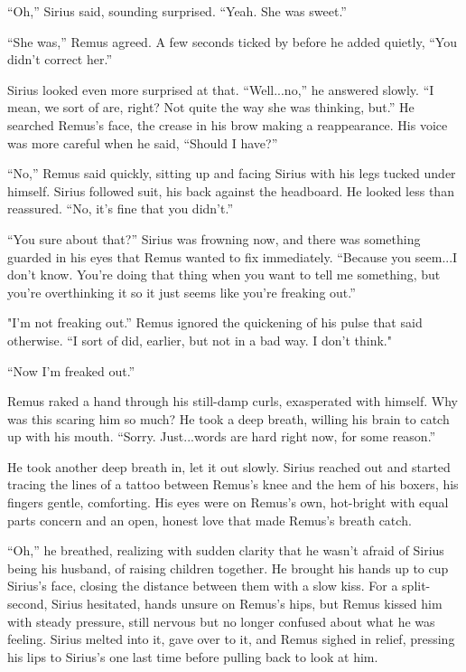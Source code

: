 “Oh,” Sirius said, sounding surprised. “Yeah. She was sweet.”

“She was,” Remus agreed. A few seconds ticked by before he added quietly, “You didn’t correct her.”

Sirius looked even more surprised at that. “Well...no,” he answered slowly. “I mean, we sort of are, right? Not quite the way she was thinking, but.” He searched Remus’s face, the crease in his brow making a reappearance. His voice was more careful when he said, “Should I have?”

“No,” Remus said quickly, sitting up and facing Sirius with his legs tucked under himself. Sirius followed suit, his back against the headboard. He looked less than reassured. “No, it’s fine that you didn’t.”

“You sure about that?” Sirius was frowning now, and there was something guarded in his eyes that Remus wanted to fix immediately. “Because you seem...I don’t know. You’re doing that thing when you want to tell me something, but you’re overthinking it so it just seems like you’re freaking out.”

"I’m not freaking out.” Remus ignored the quickening of his pulse that said otherwise. “I sort of did, earlier, but not in a bad way. I don't think."

“Now I’m freaked out.”

Remus raked a hand through his still-damp curls, exasperated with himself. Why was this scaring him so much? He took a deep breath, willing his brain to catch up with his mouth. “Sorry. Just...words are hard right now, for some reason.”

He took another deep breath in, let it out slowly. Sirius reached out and started tracing the lines of a tattoo between Remus’s knee and the hem of his boxers, his fingers gentle, comforting. His eyes were on Remus’s own, hot-bright with equal parts concern and an open, honest love that made Remus’s breath catch.

“Oh,” he breathed, realizing with sudden clarity that he wasn’t afraid of Sirius being his husband, of raising children together. He brought his hands up to cup Sirius’s face, closing the distance between them with a slow kiss. For a split-second, Sirius hesitated, hands unsure on Remus’s hips, but Remus kissed him with steady pressure, still nervous but no longer confused about what he was feeling. Sirius melted into it, gave over to it, and Remus sighed in relief, pressing his lips to Sirius’s one last time before pulling back to look at him.

